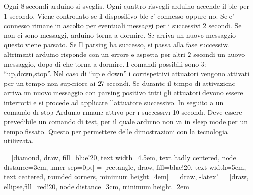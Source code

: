 \documentclass{article}
\begin{document}
Ogni 8 secondi arduino si sveglia. Ogni quattro risvegli arduino accende il ble per 1 secondo. Viene controllato se il dispositivo ble e' connesso oppure no. Se e' connesso rimane in ascolto per eventuali messaggi per i successivi 2 secondi. Se non ci sono messaggi, arduino torna a dormire. Se arriva un nuovo messaggio questo viene parsato. Se Il parsing ha successo, si passa alla fase successiva altrimenti arduino risponde con un errore e aspetta per altri 2 secondi un nuovo messaggio, dopo di che torna a dormire. I comandi possibili sono 3: ``up,down,stop''. Nel caso di ``up e down'' i corrispettivi attuatori vengono attivati per un tempo non superiore ai 27 secondi. Se durante il tempo di attivazione arriva un nuovo messaggio con parsing positivo tutti gli attuatori devono essere interrotti e si procede ad applicare l'attuatore successivo. In seguito a un comando di stop Arduino rimane attivo per i successivi 10 secondi. Deve essere prevedibile un comando di test, per il quale arduino non va in sleep mode per un tempo fissato. Questo per permettere delle dimostrazioni con la tecnologia utilizzata.



 = [diamond, draw, fill=blue!20, 
    text width=4.5em, text badly centered, node distance=3cm, inner sep=0pt]
 = [rectangle, draw, fill=blue!20, 
    text width=5em, text centered, rounded corners, minimum height=4em]
 = [draw, -latex']
 = [draw, ellipse,fill=red!20, node distance=3cm,
    minimum height=2em]
    
\end{document}
